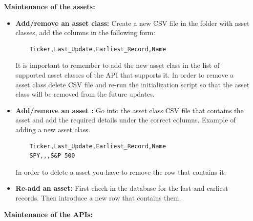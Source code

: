 \documentclass[main.tex]{subfiles}
\begin{document}
\textbf{Maintenance of the assets:}
\begin{itemize}
    \item \textbf{Add/remove an asset class: } Create a new CSV file  in the folder with asset classes, add the columns in the following form:\newline
    \begin{lstlisting}
    Ticker,Last_Update,Earliest_Record,Name
    \end{lstlisting}
    It is important to remember to add the new asset class in the list of supported asset classes of the API that supports it.\newline
    In order to remove a asset class delete CSV file and re-run the initialization script so that the asset class will be removed from the future updates. 
    \item \textbf{Add/remove an asset : } Go into the asset class CSV file that contains the asset and add the required details under the correct columns.
    Example of adding a new asset class.
    \begin{lstlisting}
    Ticker,Last_Update,Earliest_Record,Name
    SPY,,,S&P 500
    \end{lstlisting}
    In order to delete a asset you have to remove the row that contains it.
    
    \item \textbf{Re-add an asset: } First check in the database for the last and earliest records. Then introduce a new row that contains them. 
\end{itemize}

\textbf{Maintenance of the APIs:}
\end{document}
